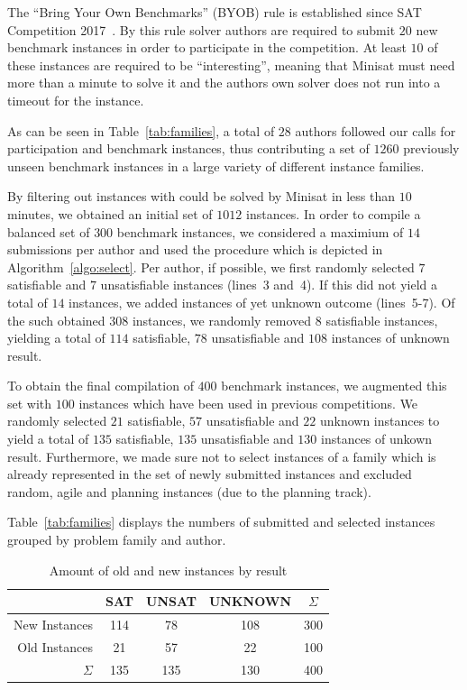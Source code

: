 \documentclass{elsarticle}
\begin{document}
The ``Bring Your Own Benchmarks'' (BYOB) rule is established since SAT Competition 2017~\cite{SC2017}. 
By this rule solver authors are required to submit $20$ new benchmark instances in order to participate in the competition. At least $10$ of these instances are required to be ``interesting'', meaning that Minisat must need more than a minute to solve it and the authors own solver does not run into a timeout for the instance. 

As can be seen in Table~\ref{tab:families}, a total of $28$ authors followed our calls for participation and benchmark instances, thus contributing a set of $1260$ previously unseen benchmark instances in a large variety of different instance families. 

By filtering out instances with could be solved by Minisat in less than $10$ minutes, we obtained an initial set of $1012$ instances. 
In order to compile a balanced set of $300$ benchmark instances, we considered a maximium of $14$ submissions per author and used the procedure which is depicted in Algorithm~\ref{algo:select}. 
Per author, if possible, we first randomly selected $7$ satisfiable and $7$ unsatisfiable instances (lines~3 and~4). 
If this did not yield a total of $14$ instances, we added instances of yet unknown outcome (lines~5-7). 
Of the such obtained $308$ instances, we randomly removed $8$ satisfiable instances, yielding a total of $114$ satisfiable, $78$ unsatisfiable and $108$ instances of unknown result. 

To obtain the final compilation of $400$ benchmark instances, we augmented this set with $100$ instances which have been used in previous competitions. 
We randomly selected $21$ satisfiable, $57$ unsatisfiable and $22$ unknown instances to yield a total of $135$ satisfiable, $135$ unsatisfiable and $130$ instances of unkown result. 
Furthermore, we made sure not to select instances of a family which is already represented in the set of newly submitted instances and excluded random, agile and planning instances (due to the planning track). 

Table~\ref{tab:families} displays the numbers of submitted and selected instances grouped by problem family and author. 

\begin{table}[t]
\centering
\begin{tabular}{|r|ccc|c|}
\hline
 & SAT & UNSAT & UNKNOWN & $\Sigma$\\
\hline\hline
New Instances & 114 & 78 & 108 & 300 \\
Old Instances & 21 & 57 & 22 & 100\\
\hline
$\Sigma$ & 135 & 135 & 130 & 400\\
\hline
\end{tabular}
\caption{Amount of old and new instances by result}
\label{tab:final}
\end{table}
\end{document}

